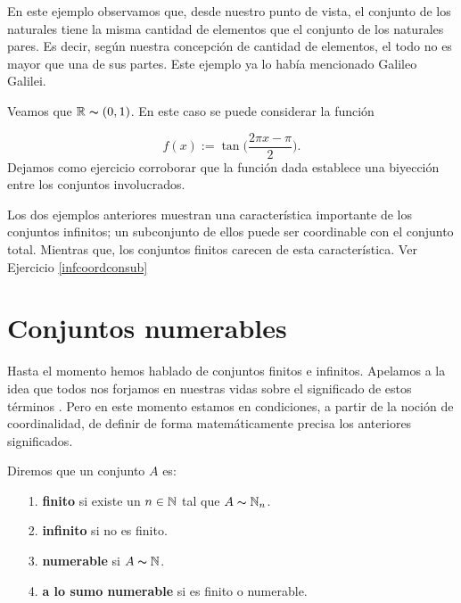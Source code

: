 En este ejemplo observamos que, desde nuestro punto de vista, el
conjunto de los naturales tiene la misma cantidad de elementos
que el conjunto de los naturales pares. Es decir, según nuestra concepción de cantidad de elementos, el
todo no es mayor que una de sus partes. Este ejemplo ya lo había mencionado Galileo Galilei.

\begin{ejemplo}\label{rcoord(0,1)} Veamos que $\mathbb{R}\thicksim (0,1)$. En este caso se
puede considerar la función

\[f(x):= \tan\biggl(\frac{2\pi x-\pi}{2}\biggr).\]
Dejamos como ejercicio corroborar que la función dada establece
una biyección entre los conjuntos involucrados.
\end{ejemplo}

Los dos ejemplos anteriores muestran una característica
importante de los conjuntos infinitos; un subconjunto de ellos
puede ser coordinable con el conjunto total. Mientras que, los
conjuntos finitos  carecen de esta característica.
Ver Ejercicio \vref{infcoordconsub}





\section{Conjuntos numerables}
Hasta el momento hemos hablado de conjuntos
finitos e infinitos. Apelamos a la idea que todos nos forjamos en nuestras vidas  sobre el significado de estos términos .  Pero en este momento estamos  en condiciones, a
partir de la noción  de coordinalidad, de definir de forma
matemáticamente precisa los anteriores  significados.
\begin{definicion} Diremos que un conjunto $A$ es:
\begin{itemize}
\item[1.] \textbf{finito} si existe un $n\in\mathbb{N}$ tal que
$A\thicksim\mathbb{N}_n$.
\item[2.] \textbf{infinito }si no es finito.
\item[3.] \textbf{numerable} si $A\thicksim\mathbb{N}$.
\item[4.] \textbf{a lo sumo numerable} si es finito o numerable.
\end{itemize}
\end{definicion}

